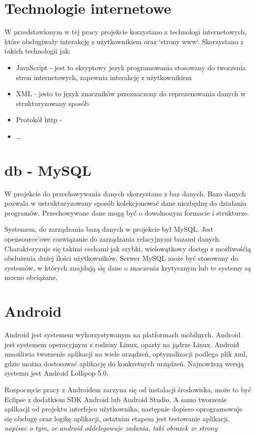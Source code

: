 \documentclass[eng,printmode,oneside]{mgr}
\begin{document}
\section{Technologie internetowe}

W przedstawionym w tej pracy projekcie korzystano z technologi internetowych,
które obsługiwały interakcję z użytkownikiem oraz `strony www`. Skorzystano
z takich technologii jak:
\begin{itemize}
  \item JavaScript - jest to skryptowy jezyk programowania stosowany do
  tworzenia stron internetowych, zapewnia interakcję z użytkownikiem\cite{javascript.wiki}
  \item XML - jesto to język znaczników przeznaczony do reprezenowania danych w
  strukturyzowany sposób \cite{xml.wiki}
  \item Protokół http - 
  \item \ldots
\end{itemize}
\section{db - MySQL}

W projekcie do przechowywania danych skorzystano z baz danych. Baza danych
pozwala w ustrukturyzowany sposób kolekcjonować dane niezbędnę do działania
programów. Przechowywane dane mogą być o dowolnonym formacie i strukturze.

Systemem, do zarządzania bazą danych w projekcie był MySQL. Jest opensource'owe
rozwiązanie do zarządzania relacyjnymi bazami danych. Charakteryzuje się takimi
cechami jak szybki, wielowątkowy dostęp z możliwośćią obsłużenia dużej ilości
użytkowników. Serwer MySQL może być stosowany do systemów, w których znajdują
się dane o znaczeniu krytycznym lub te systemy są mocno obciążane. \cite{Mysql.com} 

\section{Android}

Android jest systemem wykorzystywanym na platformach mobilnych. Android
jest systemem operacyjnym z rodziny Linux, oparty na jądrze Linux. Android
umożliwia tworzenie aplikacji na wiele urządzeń, optymalizacji podlega plik xml,
gdzie można dostosować aplikację do konkretnych urządzeń. Najnowższą wersją
systemu jest Android Lollipop 5.0. 

Rozpoczęcie pracy z Androidem zaczyna się od instalacji środowiska, może to być
Eclipse z dodatkiem SDK Android lub Android Studio. A samo tworzenie aplikacji
od projektu interfejsu użytkownika, następnie dopiero oprogramowuje się obsługę
oraz logikę aplikacji, ostatnim etapem jest testowanie aplikacji.
\cite{developer.android}
\emph{\color{komentarz}napisac o tym, ze android oddelegowuje zadania, taki
obrazek ze strony}
\end{document}
